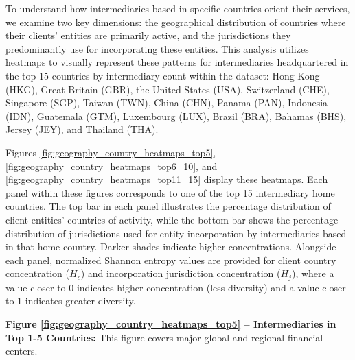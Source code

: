 To understand how intermediaries based in specific countries orient their services, we examine two key dimensions: the geographical distribution of countries where their clients' entities are primarily active, and the jurisdictions they predominantly use for incorporating these entities. This analysis utilizes heatmaps to visually represent these patterns for intermediaries headquartered in the top 15 countries by intermediary count within the dataset: Hong Kong (HKG), Great Britain (GBR), the United States (USA), Switzerland (CHE), Singapore (SGP), Taiwan (TWN), China (CHN), Panama (PAN), Indonesia (IDN), Guatemala (GTM), Luxembourg (LUX), Brazil (BRA), Bahamas (BHS), Jersey (JEY), and Thailand (THA).

Figures \ref{fig:geography_country_heatmaps_top5}, \ref{fig:geography_country_heatmaps_top6_10}, and \ref{fig:geography_country_heatmaps_top11_15} display these heatmaps. Each panel within these figures corresponds to one of the top 15 intermediary home countries. The top bar in each panel illustrates the percentage distribution of client entities' countries of activity, while the bottom bar shows the percentage distribution of jurisdictions used for entity incorporation by intermediaries based in that home country. Darker shades indicate higher concentrations. Alongside each panel, normalized Shannon entropy values are provided for client country concentration ($H_c$) and incorporation jurisdiction concentration ($H_j$), where a value closer to 0 indicates higher concentration (less diversity) and a value closer to 1 indicates greater diversity.


\textbf{Figure \ref{fig:geography_country_heatmaps_top5} – Intermediaries in Top 1-5 Countries:}
This figure covers major global and regional financial centers.

